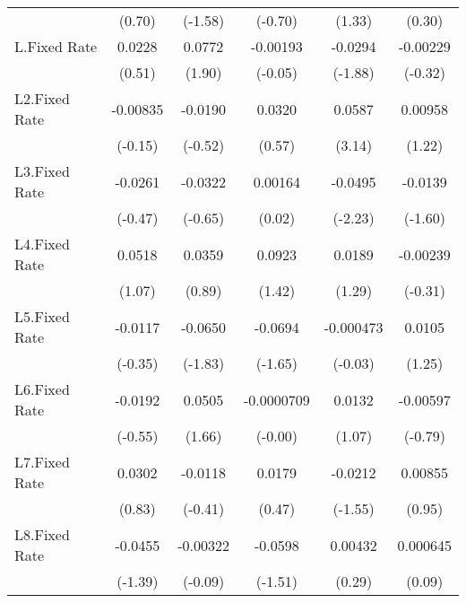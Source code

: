 {\begin{longtable}{l*{5}{c}}
                &   (0.70)         &  (-1.58)         &  (-0.70)         &   (1.33)         &   (0.30)         \\
[1em]
L.Fixed Rate    &   0.0228         &   0.0772         & -0.00193         &  -0.0294         & -0.00229         \\
                &   (0.51)         &   (1.90)         &  (-0.05)         &  (-1.88)         &  (-0.32)         \\
[1em]
L2.Fixed Rate   & -0.00835         &  -0.0190         &   0.0320         &   0.0587\sym{**} &  0.00958         \\
                &  (-0.15)         &  (-0.52)         &   (0.57)         &   (3.14)         &   (1.22)         \\
[1em]
L3.Fixed Rate   &  -0.0261         &  -0.0322         &  0.00164         &  -0.0495\sym{*}  &  -0.0139         \\
                &  (-0.47)         &  (-0.65)         &   (0.02)         &  (-2.23)         &  (-1.60)         \\
[1em]
L4.Fixed Rate   &   0.0518         &   0.0359         &   0.0923         &   0.0189         & -0.00239         \\
                &   (1.07)         &   (0.89)         &   (1.42)         &   (1.29)         &  (-0.31)         \\
[1em]
L5.Fixed Rate   &  -0.0117         &  -0.0650         &  -0.0694         &-0.000473         &   0.0105         \\
                &  (-0.35)         &  (-1.83)         &  (-1.65)         &  (-0.03)         &   (1.25)         \\
[1em]
L6.Fixed Rate   &  -0.0192         &   0.0505         &-0.0000709         &   0.0132         & -0.00597         \\
                &  (-0.55)         &   (1.66)         &  (-0.00)         &   (1.07)         &  (-0.79)         \\
[1em]
L7.Fixed Rate   &   0.0302         &  -0.0118         &   0.0179         &  -0.0212         &  0.00855         \\
                &   (0.83)         &  (-0.41)         &   (0.47)         &  (-1.55)         &   (0.95)         \\
[1em]
L8.Fixed Rate   &  -0.0455         & -0.00322         &  -0.0598         &  0.00432         & 0.000645         \\
                &  (-1.39)         &  (-0.09)         &  (-1.51)         &   (0.29)         &   (0.09)         \\

\end{longtable}}
